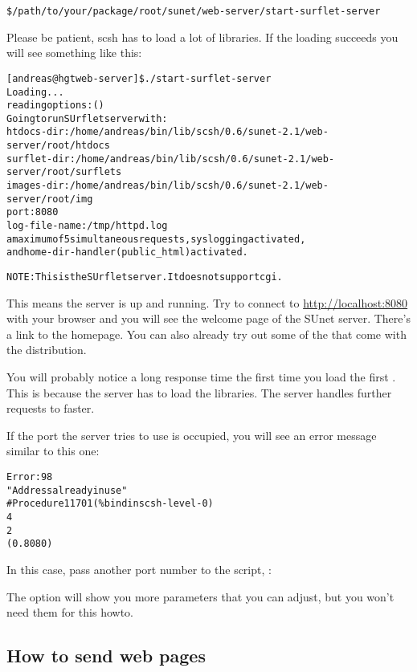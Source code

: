 \begin{alltt}
\$ /path/to/your/package/root/sunet/web-server/start-surflet-server
\end{alltt}

Please be patient, scsh has to load a lot of libraries.  If the
loading succeeds you will see something like this:

\begin{alltt}
[andreas@hgt web-server]\$ ./start-surflet-server
Loading...
reading options: ()
Going to run SUrflet server with:
 htdocs-dir:    /home/andreas/bin/lib/scsh/0.6/sunet-2.1/web-server/root/htdocs   
 surflet-dir:   /home/andreas/bin/lib/scsh/0.6/sunet-2.1/web-server/root/surflets 
 images-dir:    /home/andreas/bin/lib/scsh/0.6/sunet-2.1/web-server/root/img
 port:          8080
 log-file-name: /tmp/httpd.log
 a maximum of 5 simultaneous requests, syslogging activated, 
 and home-dir-handler (public_html) activated.

 NOTE: This is the SUrflet server. It does not support cgi.
\end{alltt}

This means the server is up and running.  Try to connect to
\url{http://localhost:8080} with your browser and you will see the
welcome page of the SUnet server.  There's a link to the
\surflets homepage.  You can also already try out some of the
\surflets that come with the distribution.

You will probably notice a long response time the first time you load
the first \surflet.  This is because the server has to load the
\surflet libraries.  The server handles further requests to \surflets
faster.

If the port the \surflet server tries to use is occupied, you will see
an error message similar to this one:

\begin{alltt}
Error: 98
       "Address already in use"
       #{Procedure 11701 (\%bind in scsh-level-0)}
       4
       2
       (0 . 8080)
\end{alltt}

In this case, pass another port number to the script, :

The  option will show you more parameters that you can
adjust, but you won't need them for this howto.


\subsection{How to send web pages}

